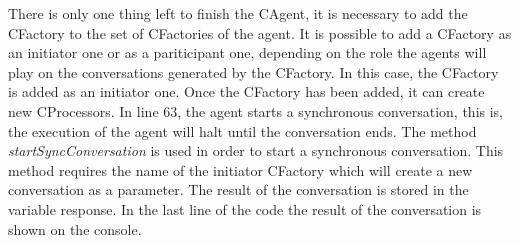 There is only one thing left to finish the CAgent, it is necessary to add the CFactory to the set of CFactories of the agent. It is possible to add a CFactory as an initiator one or as a pariticipant one, depending on the role the agents will play on the conversations generated by the CFactory. In this case, the CFactory is added as an initiator one. Once the CFactory has been added, it can create new CProcessors. In line 63, the agent starts a synchronous conversation, this is, the execution of the agent will halt until the conversation ends. The method \textit{startSyncConversation} is used in order to start a synchronous conversation. This method requires the name of the initiator CFactory which will create a new conversation as a parameter. The result of the conversation is stored in the variable response. In the last line of the code the result of the conversation is shown on the console.
